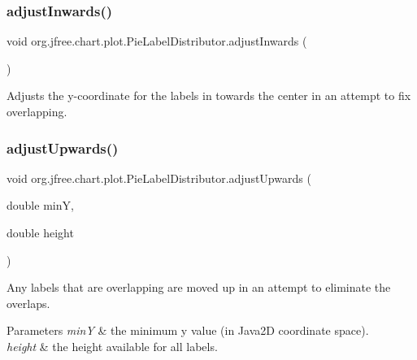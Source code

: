 \subsubsection{\texorpdfstring{adjust\+Inwards()}{adjustInwards()}}
{\footnotesize\ttfamily void org.\+jfree.\+chart.\+plot.\+Pie\+Label\+Distributor.\+adjust\+Inwards (\begin{DoxyParamCaption}{ }\end{DoxyParamCaption})\hspace{0.3cm}{\ttfamily [protected]}}

Adjusts the y-\/coordinate for the labels in towards the center in an attempt to fix overlapping. \mbox{\label{classorg_1_1jfree_1_1chart_1_1plot_1_1_pie_label_distributor_a6a3f796644616599a8794d73bd65cd0e}} 
\subsubsection{\texorpdfstring{adjust\+Upwards()}{adjustUpwards()}}
{\footnotesize\ttfamily void org.\+jfree.\+chart.\+plot.\+Pie\+Label\+Distributor.\+adjust\+Upwards (\begin{DoxyParamCaption}\item[{double}]{minY,  }\item[{double}]{height }\end{DoxyParamCaption})\hspace{0.3cm}{\ttfamily [protected]}}

Any labels that are overlapping are moved up in an attempt to eliminate the overlaps.


\begin{DoxyParams}{Parameters}
{\em minY} & the minimum y value (in Java2D coordinate space). \\
\hline
{\em height} & the height available for all labels. \\
\hline
\end{DoxyParams}
\mbox{\label{classorg_1_1jfree_1_1chart_1_1plot_1_1_pie_label_distributor_a4a742856275ba097e9c2560fc98ee749}} 
